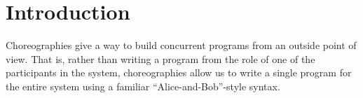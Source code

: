 \section{Introduction}

Choreographies give a way to build concurrent programs from an outside point of view.
That is, rather than writing a program from the role of one of the participants in the system, choreographies allow us to write a single program for the entire system using a familiar ``Alice-and-Bob''-style syntax.


